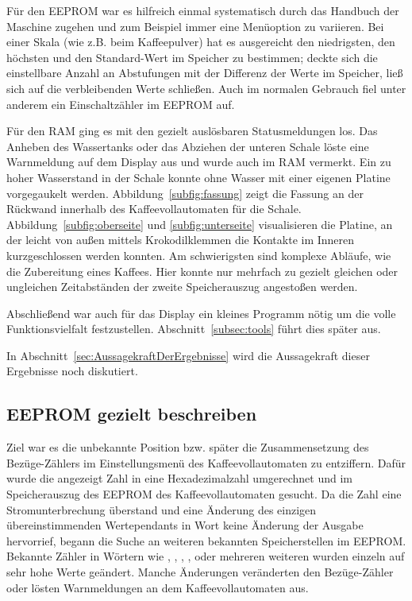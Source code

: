 Für den \ac{EEPROM} war es hilfreich einmal systematisch durch das Handbuch der Maschine zugehen und zum Beispiel immer eine Menüoption zu variieren.
Bei einer Skala (wie z.B. beim Kaffeepulver) hat es ausgereicht den niedrigsten, den höchsten und den Standard-Wert im Speicher zu bestimmen;
deckte sich die einstellbare Anzahl an Abstufungen mit der Differenz der Werte im Speicher, ließ sich auf die verbleibenden Werte schließen.
Auch im normalen Gebrauch fiel unter anderem ein Einschaltzähler im \ac{EEPROM} auf.

Für den \ac{RAM} ging es mit den gezielt auslösbaren Statusmeldungen los.
Das Anheben des Wassertanks oder das Abziehen der unteren Schale löste eine Warnmeldung auf dem Display aus und wurde auch im \ac{RAM} vermerkt.
Ein zu hoher Wasserstand in der Schale konnte ohne Wasser mit einer eigenen Platine vorgegaukelt werden.
Abbildung~\ref{subfig:fassung} zeigt die Fassung an der Rückwand innerhalb des Kaffeevollautomaten für die Schale.
Abbildung~\ref{subfig:oberseite} und \ref{subfig:unterseite} visualisieren die Platine, an der leicht von außen mittels Krokodilklemmen die Kontakte im Inneren kurzgeschlossen werden konnten.
Am schwierigsten sind komplexe Abläufe, wie die Zubereitung eines Kaffees.
Hier konnte nur mehrfach zu gezielt gleichen oder ungleichen Zeitabständen der zweite Speicherauszug angestoßen werden.

Abschließend war auch für das Display ein kleines Programm nötig um die volle Funktionsvielfalt festzustellen.
Abschnitt~\ref{subsec:tools} führt dies später aus.

In Abschnitt~\ref{sec:AussagekraftDerErgebnisse} wird die Aussagekraft dieser Ergebnisse noch diskutiert.

\subsection{EEPROM gezielt beschreiben}\label{subsec:Vorgehen2}
Ziel war es die unbekannte Position bzw. später die Zusammensetzung des Bezüge-Zählers im Einstellungsmenü des Kaffeevollautomaten zu entziffern.
Dafür wurde die angezeigt Zahl in eine Hexadezimalzahl umgerechnet und im Speicherauszug des \ac{EEPROM} des Kaffeevollautomaten gesucht.
Da die Zahl eine Stromunterbrechung überstand und eine Änderung des einzigen übereinstimmenden Wertependants in Wort  keine Änderung der Ausgabe hervorrief, begann die Suche an weiteren bekannten Speicherstellen im \ac{EEPROM}.
Bekannte Zähler in Wörtern wie , , , ,  oder mehreren weiteren wurden einzeln auf sehr hohe Werte geändert.
Manche Änderungen veränderten den Bezüge-Zähler oder lösten Warnmeldungen an dem Kaffeevollautomaten aus.

